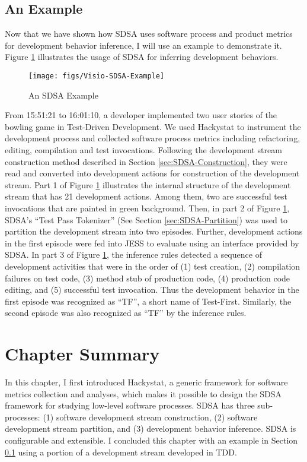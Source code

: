 \subsection{An Example}
\label{sec:SDSA-Example}
Now that we have shown how SDSA uses software process and 
product metrics for development behavior inference, I will 
use an example to demonstrate it. Figure \ref{fig:SDSA-Example} 
illustrates the usage of SDSA for inferring development behaviors. 
\begin{figure}[htbp]
  \centering
  \texttt{[image: figs/Visio-SDSA-Example]}
  \caption{An SDSA Example}
  \label{fig:SDSA-Example}
\end{figure}
From 15:51:21 to 16:01:10, a developer implemented two user stories
of the bowling game in Test-Driven Development. We used Hackystat 
to instrument the development process and collected software process 
metrics including refactoring, editing, compilation and test 
invocations. Following the development stream construction method
described in Section \ref{sec:SDSA-Construction}, they were read 
and converted into development actions for construction of the
development stream. Part 1 of Figure \ref{fig:SDSA-Example} 
illustrates the internal structure of the development stream
that has 21 development actions. Among them, two are successful
test invocations that are painted in green background. Then, 
in part 2 of Figure \ref{fig:SDSA-Example}, SDSA's 
``Test Pass Tokenizer'' (See Section \ref{sec:SDSA-Partition}) 
was used to partition the development stream into two episodes. 
Further, development actions in the first episode were fed into
JESS to evaluate using an interface provided by SDSA. In part 3 
of Figure \ref{fig:SDSA-Example}, the inference rules detected 
a sequence of development activities that were in the order of 
(1) test creation, (2) compilation failures on test code, 
(3) method stub of production code, (4) production code editing, 
and (5) successful test invocation. Thus the development behavior 
in the first episode was recognized as ``TF'', a short name of 
Test-First. Similarly, the second episode was also recognized 
as ``TF'' by the inference rules.


\section{Chapter Summary}
In this chapter, I first introduced Hackystat, a generic 
framework for software metrics collection and analyses, 
which makes it possible to design the SDSA framework for 
studying low-level software processes. SDSA has three 
sub-processes: (1) software development stream construction, 
(2) software development stream partition, and (3) 
development behavior inference. SDSA is configurable 
and extensible. I concluded this chapter with an example 
in Section \ref{sec:SDSA-Example} using a portion of a 
development stream developed in TDD. 